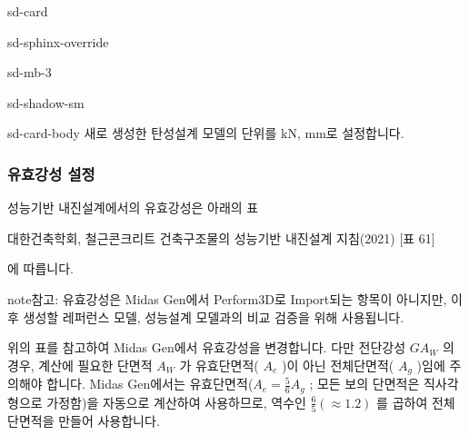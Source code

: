 \documentclass[a4paper,10pt,korean]{sphinxmanual}
\begin{document}
\begin{sphinxuseclass}{sd-card}
\begin{sphinxuseclass}{sd-sphinx-override}
\begin{sphinxuseclass}{sd-mb-3}
\begin{sphinxuseclass}{sd-shadow-sm}
\begin{sphinxuseclass}{sd-card-body}
\sphinxAtStartPar
새로 생성한 탄성설계 모델의 단위를 kN, mm로 설정합니다.

\end{sphinxuseclass}
\end{sphinxuseclass}
\end{sphinxuseclass}
\end{sphinxuseclass}
\end{sphinxuseclass}
\sphinxstepscope


\subsubsection{유효강성 설정}
\label{\detokenize{1_stiffness_setting:id1}}\label{\detokenize{1_stiffness_setting::doc}}
\sphinxAtStartPar
성능기반 내진설계에서의 유효강성은 아래의 표%
\begin{footnote}[1]\sphinxAtStartFootnote
대한건축학회, 철근콘크리트 건축구조물의 성능기반 내진설계 지침(2021) {[}표 6\sphinxhyphen{}1{]}
%
\end{footnote} 에 따릅니다.

\begin{figure}[htbp]
\centering
\capstart

\noindent{}
\caption{}\label{\detokenize{1_stiffness_setting:id8}}\end{figure}

\begin{sphinxadmonition}{note}{참고:}
\sphinxAtStartPar
유효강성은 Midas Gen에서 Perform\sphinxhyphen{}3D로 Import되는 항목이 아니지만,
이 후 생성할 레퍼런스 모델, 성능설계 모델과의 비교 검증을 위해 사용됩니다.
\end{sphinxadmonition}

\sphinxAtStartPar
위의 표를 참고하여 Midas Gen에서 유효강성을 변경합니다. 다만 전단강성 \(GA_W\) 의 경우, 계산에 필요한 단면적 \(A_W\) 가
유효단면적( \(A_e\) )이 아닌 전체단면적( \(A_g\) )임에 주의해야 합니다.
Midas Gen에서는 유효단면적(\(A_e = \frac{5}{6}A_g\) ; 모든 보의 단면적은 직사각형으로 가정함)을 자동으로 계산하여 사용하므로,
역수인 \(\frac{6}{5}(\approx 1.2)\) 를 곱하여 전체단면적을 만들어 사용합니다.
\end{document}
